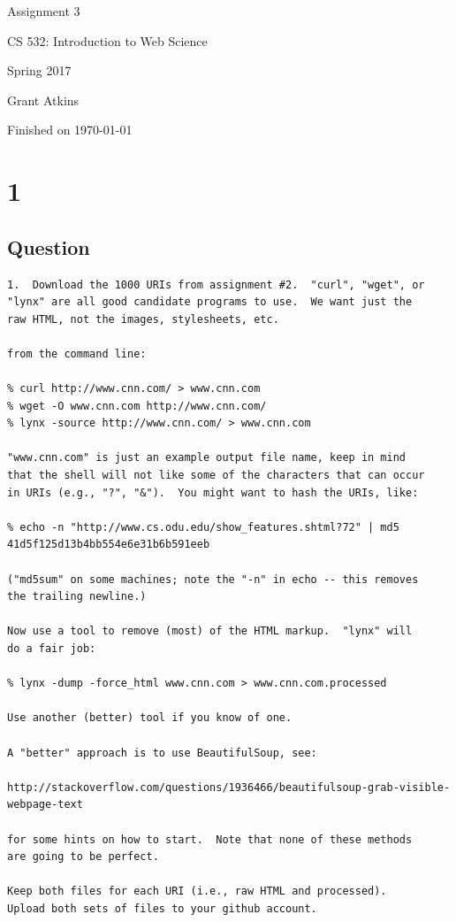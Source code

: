 \documentclass[letterpaper,11pt]{article}
\begin{document}
\begin{titlepage}

\begin{center}

\Huge{Assignment 3}

\Large{CS 532:  Introduction to Web Science}

\Large{Spring 2017}

\Large{Grant Atkins}

\Large Finished on \today

\end{center}

\end{titlepage}

\newpage


\section*{1}


\subsection*{Question}

\begin{verbatim}
1.  Download the 1000 URIs from assignment #2.  "curl", "wget", or
"lynx" are all good candidate programs to use.  We want just the
raw HTML, not the images, stylesheets, etc.

from the command line:

% curl http://www.cnn.com/ > www.cnn.com
% wget -O www.cnn.com http://www.cnn.com/
% lynx -source http://www.cnn.com/ > www.cnn.com

"www.cnn.com" is just an example output file name, keep in mind
that the shell will not like some of the characters that can occur
in URIs (e.g., "?", "&").  You might want to hash the URIs, like:

% echo -n "http://www.cs.odu.edu/show_features.shtml?72" | md5
41d5f125d13b4bb554e6e31b6b591eeb

("md5sum" on some machines; note the "-n" in echo -- this removes
the trailing newline.) 

Now use a tool to remove (most) of the HTML markup.  "lynx" will
do a fair job:

% lynx -dump -force_html www.cnn.com > www.cnn.com.processed

Use another (better) tool if you know of one.  

A "better" approach is to use BeautifulSoup, see:

http://stackoverflow.com/questions/1936466/beautifulsoup-grab-visible-webpage-text

for some hints on how to start.  Note that none of these methods 
are going to be perfect.

Keep both files for each URI (i.e., raw HTML and processed). 
Upload both sets of files to your github account.
\end{verbatim}
\end{document}
